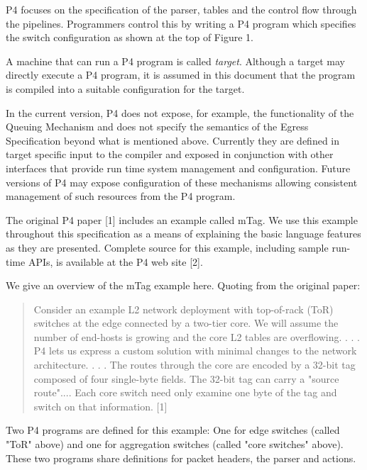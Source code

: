 \documentclass[12pt]{article}
\begin{document}
P4 focuses on the specification of the parser, \matchaction tables and the 
control flow through the pipelines. Programmers control this by writing a 
P4 program which specifies the switch configuration as shown at the top of 
Figure 1. 

A machine that can run a P4 program is called \textit{target}. Although a target 
may directly execute a P4 program, it is assumed in this document that the 
program is compiled into a suitable configuration for the target.

In the current version, P4 does not expose, for example, the functionality 
of the Queuing Mechanism and does not specify the semantics of the Egress 
Specification beyond what is mentioned above. Currently they are defined in 
target specific input to the compiler and exposed in conjunction with other 
interfaces that provide run time system management and configuration. Future 
versions of P4 may expose configuration of these mechanisms allowing consistent 
management of such resources from the P4 program.


The original P4 paper [1] includes an example called mTag. We use this example 
throughout this specification as a means of explaining the basic language 
features as they are presented. Complete source for this example, including 
sample run-time APIs, is available at the P4 web site [2].

We give an overview of the mTag example here.  Quoting from the original paper:

\begin{quote}
Consider an example L2 network deployment with top-of-rack (ToR) switches 
at the edge connected by a two-tier core. We will assume the number of end-hosts 
is growing and the core L2 tables are overflowing. . . .  P4 lets us express a 
custom solution with minimal changes to the network architecture. . . . The routes 
through the core are encoded by a 32-bit tag composed of four single-byte 
fields.  The 32-bit tag can carry a "source route".... Each core switch need 
only examine one byte of the tag and switch on that information. [1]
\end{quote}

Two P4 programs are defined for this example: One for edge switches (called 
"ToR" above) and one for aggregation switches (called "core switches" above). 
These two programs share definitions for packet headers, the parser and actions.

\end{document}
